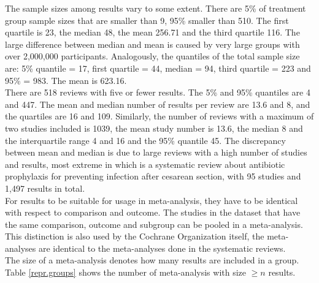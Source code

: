 \documentclass[11pt,a4paper,twoside]{book}\usepackage[]{graphicx}\usepackage[]{color}
\begin{document}
The sample sizes among results vary to some extent. There are 5\% of treatment group sample sizes that are smaller than 9, 95\% smaller than 510. The first quartile is 23, the median 48, the mean 256.71 and the third quartile 116. The large difference between median and mean is caused by very large groups with over 2,000,000 participants. Analogously, the quantiles of the total sample size are: 5\% quantile = 17, first quartile = 44, median = 94, third quartile = 223 and 95\% = 983. The mean is 623.16. \\
There are 518 reviews with five or fewer results. The 5\% and 95\% quantiles are 4 and 447. The mean and median number of results per review are 13.6 and 8, and the quartiles are 16 and 109. Similarly, the number of reviews with a maximum of two studies included is 1039, the mean study number is 13.6, the median 8 and the interquartile range 4 and 16 and the 95\% quantile 45. The discrepancy between mean and median is due to large reviews with a high number of studies and results, most extreme in %
which is a systematic review about antibiotic prophylaxis for preventing infection after cesarean section, with 95 studies and 1,497 results in total.\\
For results to be suitable for usage in meta-analysis, they have to be identical with respect to comparison and outcome. The studies in the dataset that have the same comparison, outcome and subgroup can be pooled in a meta-analysis. This distinction is also used by the Cochrane Organization itself, \ie the meta-analyses are identical to the meta-analyses done in the systematic reviews.\\ %
The size of a meta-analysis denotes how many results are included in a group. Table \ref{repr.groups} shows the number of meta-analysis with size $\geq n$ results. 
\end{document}
